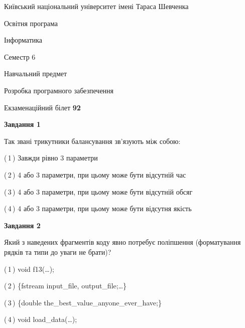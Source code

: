 \documentclass[10pt, ukrainian]{article}
\begin{document}
{{\begin {small}\par
{ \center  Київський національний університет імені Тараса Шевченка \par}
{\parbox {5 cm}{Освітня програма \hfill}{\parbox {7 cm}{Інформатика \hfill}}\parbox {6 cm}{\hfill Семестр 6}}\par
{\parbox {5 cm} {Навчальний предмет \hfill}\parbox {7 cm}{Розробка програмного забезпечення \hfill}\parbox {6cm}{\hfill}\par}\vspace{-7pt} \end{small}}{\center Екзаменаційний білет \No \textbf
{ 92 }\par}}
{
\begin {large}
{\begin {center}\textbf{Завдання 1}\end {center}}\par
Так звані трикутники балансування зв'язують між собою:\par
\vspace{2mm}



(\,1\,) Завжди рівно 3 параметри%



(\,2\,) 4 або 3 параметри, при цьому може бути відсутній час%



(\,3\,) 4 або 3 параметри, при цьому може бути відсутній обсяг %



(\,4\,) 4 або 3 параметри, при цьому може бути відсутня якість%


{\begin {center}\textbf{Завдання 2}\end {center}}\par
Який з наведених фрагментів коду явно потребує поліпшення (форматування рядків та типи до уваги не брати)?\par
\vspace{2mm}



(\,1\,) void f13(…);%



(\,2\,) \{fstream input\_file, output\_file;…\} %



(\,3\,) \{double the\_best\_value\_anyone\_ever\_have;\} %



(\,4\,) void load\_data(…);%



\end{large}}
\end{document}
